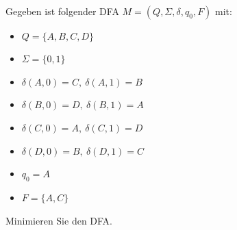 \\
Gegeben ist folgender DFA $M = (Q, \Sigma, \delta, q_0, F)$ mit:
\begin{itemize}
    \item $Q = \{A, B, C, D\}$
    \item $\Sigma = \{0,1\}$
    \item $\delta(A,0)=C,\ \delta(A,1)=B$
    \item $\delta(B,0)=D,\ \delta(B,1)=A$
    \item $\delta(C,0)=A,\ \delta(C,1)=D$
    \item $\delta(D,0)=B,\ \delta(D,1)=C$
    \item $q_0 = A$
    \item $F = \{A,C\}$
\end{itemize}
Minimieren Sie den DFA.

